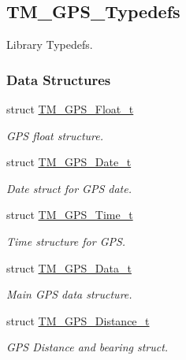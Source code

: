 \hypertarget{group___t_m___g_p_s___typedefs}{}\subsection{T\+M\+\_\+\+G\+P\+S\+\_\+\+Typedefs}
\label{group___t_m___g_p_s___typedefs}


Library Typedefs.  


\subsubsection*{Data Structures}
\begin{DoxyCompactItemize}
\item 
struct \hyperlink{struct_t_m___g_p_s___float__t}{T\+M\+\_\+\+G\+P\+S\+\_\+\+Float\+\_\+t}
\begin{DoxyCompactList}\small\item\em G\+P\+S float structure. \end{DoxyCompactList}\item 
struct \hyperlink{struct_t_m___g_p_s___date__t}{T\+M\+\_\+\+G\+P\+S\+\_\+\+Date\+\_\+t}
\begin{DoxyCompactList}\small\item\em Date struct for G\+P\+S date. \end{DoxyCompactList}\item 
struct \hyperlink{struct_t_m___g_p_s___time__t}{T\+M\+\_\+\+G\+P\+S\+\_\+\+Time\+\_\+t}
\begin{DoxyCompactList}\small\item\em Time structure for G\+P\+S. \end{DoxyCompactList}\item 
struct \hyperlink{struct_t_m___g_p_s___data__t}{T\+M\+\_\+\+G\+P\+S\+\_\+\+Data\+\_\+t}
\begin{DoxyCompactList}\small\item\em Main G\+P\+S data structure. \end{DoxyCompactList}\item 
struct \hyperlink{struct_t_m___g_p_s___distance__t}{T\+M\+\_\+\+G\+P\+S\+\_\+\+Distance\+\_\+t}
\begin{DoxyCompactList}\small\item\em G\+P\+S Distance and bearing struct. \end{DoxyCompactList}\end{DoxyCompactItemize}

